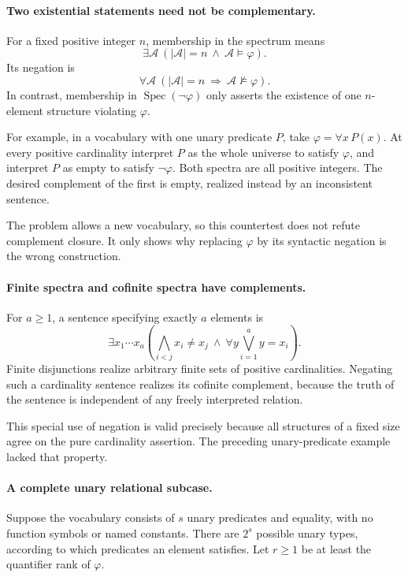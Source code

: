 \documentclass[11pt]{article}
\begin{document}
\paragraph{Two existential statements need not be complementary.}
For a fixed positive integer $n$, membership in the spectrum means
\[
 \exists\mathcal A\ (|\mathcal A|=n\ \wedge\ \mathcal A\models\varphi).
\]
Its negation is
\[
 \forall\mathcal A\ (|\mathcal A|=n\ \Longrightarrow\
                                      \mathcal A\not\models\varphi).
 \tag{272.1}
\]
In contrast, membership in $\operatorname{Spec}(\neg\varphi)$ only asserts the existence of one $n$-element structure violating $\varphi$.

For example, in a vocabulary with one unary predicate $P$, take
$\varphi=\forall x\,P(x)$. At every positive cardinality interpret $P$ as the whole universe to satisfy $\varphi$, and interpret $P$ as empty to satisfy $\neg\varphi$. Both spectra are all positive integers. The desired complement of the first is empty, realized instead by an inconsistent sentence.

The problem allows a new vocabulary, so this countertest does not refute complement closure. It only shows why replacing $\varphi$ by its syntactic negation is the wrong construction.

\paragraph{Finite spectra and cofinite spectra have complements.}
For $a\ge1$, a sentence specifying exactly $a$ elements is
\[
 \exists x_1\cdots x_a\left(
 \bigwedge_{i<j}x_i\ne x_j\ \wedge\
 \forall y\bigvee_{i=1}^a y=x_i\right).
\]
Finite disjunctions realize arbitrary finite sets of positive cardinalities. Negating such a cardinality sentence realizes its cofinite complement, because the truth of the sentence is independent of any freely interpreted relation.

This special use of negation is valid precisely because all structures of a fixed size agree on the pure cardinality assertion. The preceding unary-predicate example lacked that property.

\paragraph{A complete unary relational subcase.}
Suppose the vocabulary consists of $s$ unary predicates and equality, with no function symbols or named constants. There are $2^s$ possible unary types, according to which predicates an element satisfies. Let $r\ge1$ be at least the quantifier rank of $\varphi$.
\end{document}
